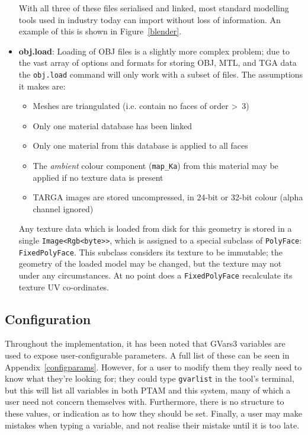 \documentclass[a4paper,10pt]{article}
\begin{document}
\begin{itemize}
{With all three of these files serialised and linked, most standard modelling tools used in industry today can import without loss of information. An example of this is shown in Figure~\ref{blender}.}
\item{\textbf{obj.load}: Loading of OBJ files is a slightly more complex problem; due to the vast array of options and formats for storing OBJ, MTL, and TGA data the \texttt{obj.load} command will only work with a subset of files. The assumptions it makes are:
\begin{itemize}
\item{Meshes are triangulated (i.e. contain no faces of order \textgreater~3)}
\item{Only one material database has been linked}
\item{Only one material from this database is applied to all faces}
\item{The \textit{ambient} colour component (\texttt{map\_Ka}) from this material may be applied if no texture data is present}
\item{TARGA images are stored uncompressed, in 24-bit or 32-bit colour (alpha channel ignored)}
\end{itemize}

Any texture data which is loaded from disk for this geometry is stored in a single \texttt{Image\textless Rgb\textless byte\textgreater \textgreater}, which is assigned to a special subclass of \texttt{PolyFace}: \texttt{FixedPolyFace}. This subclass considers its texture to be immutable; the geometry of the loaded model may be changed, but the texture may not under any circumstances. At no point does a \texttt{FixedPolyFace} recalculate its texture UV co-ordinates.
}
\end{itemize}

\subsection{Configuration}
Throughout the implementation, it has been noted that GVars3 variables are used to expose user-configurable parameters. A full list of these can be seen in Appendix~\ref{configparams}. However, for a user to modify them they really need to know what they're looking for; they could type \texttt{gvarlist} in the tool's terminal, but this will list all variables in both PTAM and this system, many of which a user need not concern themselves with. Furthermore, there is no structure to these values, or indication as to how they should be set. Finally, a user may make mistakes when typing a variable, and not realise their mistake until it is too late.
\end{document}
